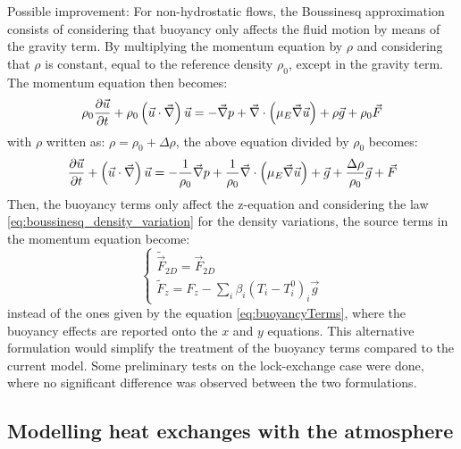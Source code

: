 \begin{CommentBlock}{Possible improvement:}
For non-hydrostatic flows, the Boussinesq approximation consists of considering that
buoyancy only affects the fluid motion by means of the gravity term.
By multiplying the momentum equation by $\rho$ and considering that $\rho$
is constant, equal to the reference density $\rho_0$, except in the gravity term.
The momentum equation then becomes:
\begin{equation}
      \rho_0\dfrac{\partial \vec{u} }{\partial t}
      + \rho_0\left(\vec{u}\cdot\vec{\nabla}\right)\vec{u} = - \vec{\nabla} p
      + \vec{\nabla} \cdot \left(\mu_E \vec \nabla \vec{u}\right) + \rho\vec{g} + \rho_0\vec{F}
\end{equation}
with $\rho$ written as: $\rho = \rho_0 + \Delta \rho$, the above equation divided by $\rho_0$ becomes:
\begin{equation}
      \dfrac{\partial \vec{u} }{\partial t}
      + \left(\vec{u}\cdot\vec{\nabla}\right)\vec{u} = - \dfrac{1}{\rho_0}\vec{\nabla} p
      + \dfrac{1}{\rho_0}\vec{\nabla} \cdot \left(\mu_E \vec \nabla \vec{u}\right) + \vec{g}
      + \dfrac{\Delta \rho}{\rho_0}\vec{g} + \vec{F}
\end{equation}
Then, the buoyancy terms only affect the z-equation and considering the law \eqref{eq:boussinesq_density_variation} for
the density variations, the source terms in the momentum equation become:
\begin{equation}\left\{\begin{array}{l}
  \tilde{\vec{F}}_{2D} = \vec{F}_{2D}\\
    \tilde{F}_{z} = F_{z}-\sum\limits_{i}\beta_{i}\left(  T_{i}-T_{i}%
^{0}\right)  _{i}\vec{g}\end{array}\right.
  \label{eq:alternativeBuoyancyTerms}
\end{equation}
instead of the ones given by the equation \eqref{eq:buoyancyTerms}, where the buoyancy effects are reported onto the $x$ and $y$ equations. This alternative formulation would simplify the treatment
of the buoyancy terms compared to the current model. Some preliminary tests on the lock-exchange
case were done, where no significant difference was observed between the two formulations.
\end{CommentBlock}

\subsection{\label{echanges thermiques}Modelling heat exchanges with the atmosphere%
}


